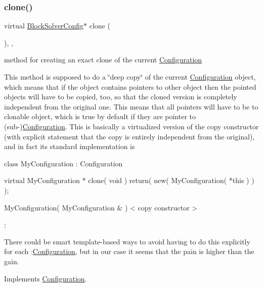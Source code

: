 \subsubsection{\texorpdfstring{clone()}{clone()}}
{\footnotesize\ttfamily virtual \mbox{\hyperlink{class_s_m_spp__di__unipi__it_1_1_block_solver_config}{Block\+Solver\+Config}}$\ast$ clone (\begin{DoxyParamCaption}\item[{void}]{ }\end{DoxyParamCaption})\hspace{0.3cm}{\ttfamily [inline]}, {\ttfamily [override]}, {\ttfamily [virtual]}}



method for creating an exact clone of the current \mbox{\hyperlink{class_s_m_spp__di__unipi__it_1_1_configuration}{Configuration}} 

This method is supposed to do a \char`\"{}deep copy\char`\"{} of the current \mbox{\hyperlink{class_s_m_spp__di__unipi__it_1_1_configuration}{Configuration}} object, which means that if the object contains pointers to other object then the pointed objects will have to be copied, too, so that the cloned version is completely independent from the original one. This means that all pointers will have to be to clonable object, which is true by default if they are pointer to (sub-\/)\mbox{\hyperlink{class_s_m_spp__di__unipi__it_1_1_configuration}{Configuration}}. This is basically a virtualized version of the copy constructor (with explicit statement that the copy is entirely independent from the original), and in fact its standard implementation is \begin{DoxyVerb}class MyConfiguration : Configuration {
 virtual MyConfiguration * clone( void ) {
 return( new( MyConfiguration( *this ) ) );
 }

 MyConfiguration( MyConfiguration & ) { < copy constructor > }
 };
\end{DoxyVerb}


There could be smart template-\/based ways to avoid having to do this explicitly for each \+:\mbox{\hyperlink{class_s_m_spp__di__unipi__it_1_1_configuration}{Configuration}}, but in our case it seems that the pain is higher than the gain. 

Implements \mbox{\hyperlink{class_s_m_spp__di__unipi__it_1_1_configuration_aa982da3f095d1a857dc95d53ac335700}{Configuration}}.

\mbox{\label{class_s_m_spp__di__unipi__it_1_1_block_solver_config_a77ea86dbac698a4e8416ed29849c582e}} 
